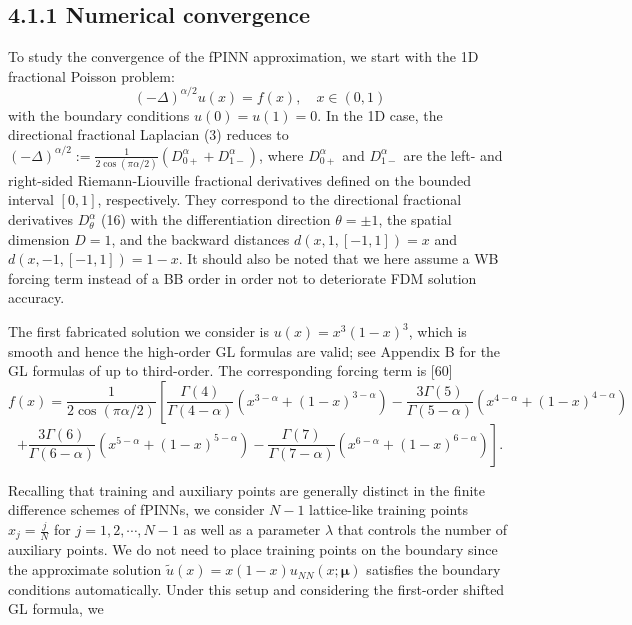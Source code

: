 \documentclass[UTF8]{article}
\begin{document}
\subsection{4.1.1 Numerical convergence}
To study the convergence of the fPINN approximation, we start with the 1D fractional Poisson problem:
\begin{equation}
(-\Delta)^{\alpha/2} u(x) = f(x), \quad x \in (0, 1)
\end{equation}
with the boundary conditions $u(0) = u(1) = 0$. In the 1D case, the directional fractional Laplacian (3) reduces to $(-\Delta)^{\alpha/2} := \frac{1}{2\cos(\pi\alpha/2)} (D_{0+}^\alpha + D_{1-}^\alpha)$, where $D_{0+}^\alpha$ and $D_{1-}^\alpha$ are the left- and right-sided Riemann-Liouville fractional derivatives defined on the bounded interval $[0, 1]$, respectively. They correspond to the directional fractional derivatives $D_\theta^\alpha$ (16) with the differentiation direction $\theta = \pm 1$, the spatial dimension $D = 1$, and the backward distances $d(x, 1, [-1, 1]) = x$ and $d(x, -1, [-1, 1]) = 1-x$. It should also be noted that we here assume a WB forcing term instead of a BB order in order not to deteriorate FDM solution accuracy.

The first fabricated solution we consider is $u(x) = x^3(1-x)^3$, which is smooth and hence the high-order GL formulas are valid; see Appendix B for the GL formulas of up to third-order. The corresponding forcing term is [60]
\begin{equation}
f(x) = \frac{1}{2\cos(\pi\alpha/2)} \left[ \frac{\Gamma(4)}{\Gamma(4-\alpha)}(x^{3-\alpha} + (1-x)^{3-\alpha}) - \frac{3\Gamma(5)}{\Gamma(5-\alpha)}(x^{4-\alpha} + (1-x)^{4-\alpha}) \right.
\end{equation}
$$\left. + \frac{3\Gamma(6)}{\Gamma(6-\alpha)}(x^{5-\alpha} + (1-x)^{5-\alpha}) - \frac{\Gamma(7)}{\Gamma(7-\alpha)}(x^{6-\alpha} + (1-x)^{6-\alpha}) \right].$$

Recalling that training and auxiliary points are generally distinct in the finite difference schemes of fPINNs, we consider $N-1$ lattice-like training points $x_j = \frac{j}{N}$ for $j = 1, 2, \cdots, N-1$ as well as a parameter $\lambda$ that controls the number of auxiliary points. We do not need to place training points on the boundary since the approximate solution $\tilde{u}(x) = x(1-x)u_{NN}(x; \boldsymbol{\mu})$ satisfies the boundary conditions automatically. Under this setup and considering the first-order shifted GL formula, we
\end{document}
